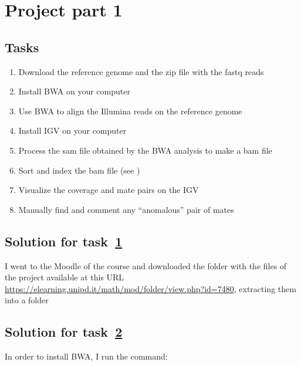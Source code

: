 \chapter{Project part 1}
\section{Tasks}
\begin{enumerate}
\item Download the reference genome and the zip file with the fastq reads
\label{itm:1.1}

\item Install BWA on your computer
\label{itm:1.2}

\item Use BWA to align the Illumina reads on the reference genome
\label{itm:1.3}

\item Install IGV on your computer
\label{itm:1.4}

\item Process the sam file obtained by the BWA analysis to make a bam file
\label{itm:1.5}

\item Sort and index the bam file (see )
\label{itm:1.6}

\item Visualize the coverage and mate pairs on the IGV
\label{itm:1.7}

\item Manually find and comment any ``anomalous'' pair of mates
\label{itm:1.8}
\end{enumerate}

\section{Solution for task~\hyperref[itm:1.1]{1}}
I went to the Moodle of the course and downloaded the folder with the files of
the project available at this URL 
\url{https://elearning.unipd.it/math/mod/folder/view.php?id=7480}, extracting
them into a folder

\section{Solution for task~\hyperref[itm:1.2]{2}}
In order to install BWA, I run the command:


